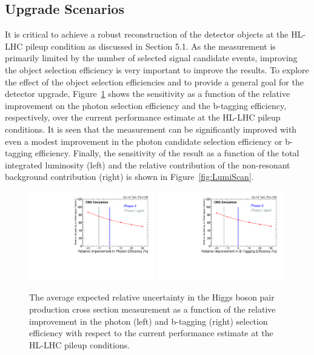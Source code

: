 \subsection{Upgrade Scenarios}
\label{sec:scenarios}

It is critical to achieve a robust reconstruction of the detector objects at the HL-LHC pileup condition as discussed in Section 5.1. As the measurement is primarily limited by the number of selected signal candidate events, improving the object selection efficiency is very important to improve the results. To explore the effect of the object selection efficiencies and to provide a general goal for the detector upgrade, Figure~\ref{fig:PhotonEffImprovementScan} shows the sensitivity as a function of the relative improvement on the photon selection efficiency and the b-tagging efficiency, respectively, over the current performance estimate at the HL-LHC pileup conditions. It is seen that the measurement can be significantly improved with even a modest improvement in the photon candidate selection efficiency or b-tagging efficiency. Finally, the sensitivity of the result as a function of the total integrated luminosity (left) and the relative contribution of the non-resonant background contribution (right) is shown in Figure~\ref{fig:LumiScan}.
\begin{figure}[h]
  \centering
  \includegraphics[width=0.49\textwidth]{figures_chapter6/XSUncertaintyVsPhotonEffRatio.pdf}
  \includegraphics[width=0.49\textwidth]{figures_chapter6/XSUncertaintyVsBtagEffRatio.pdf}
  \caption{ The average expected relative uncertainty in the Higgs boson pair production cross section measurement as a function of the relative improvement in the photon (left) and b-tagging (right) selection efficiency with respect to the current performance estimate at the HL-LHC pileup conditions.}
  \label{fig:PhotonEffImprovementScan}
\end{figure}
